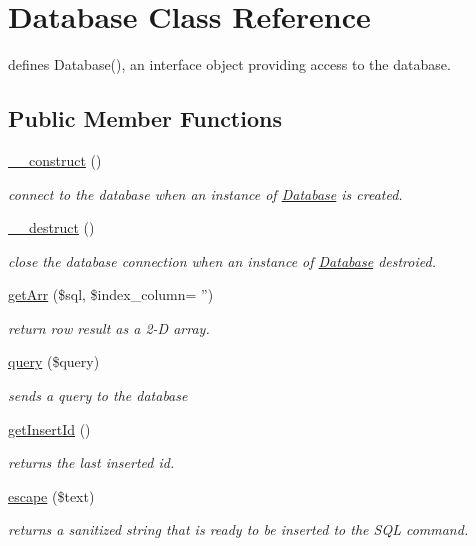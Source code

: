 \hypertarget{class_database}{
\section{Database Class Reference}
\label{class_database}
}


defines Database(), an interface object providing access to the database.  


\subsection*{Public Member Functions}
\begin{DoxyCompactItemize}
\item 
\hyperlink{class_database_a095c5d389db211932136b53f25f39685}{\_\-\_\-construct} ()
\begin{DoxyCompactList}\small\item\em connect to the database when an instance of \hyperlink{class_database}{Database} is created. \item\end{DoxyCompactList}\item 
\hyperlink{class_database_a421831a265621325e1fdd19aace0c758}{\_\-\_\-destruct} ()
\begin{DoxyCompactList}\small\item\em close the database connection when an instance of \hyperlink{class_database}{Database} destroied. \item\end{DoxyCompactList}\item 
\hyperlink{class_database_adcf17a809c87f756d7645da0483e9362}{getArr} (\$sql, \$index\_\-column= '')
\begin{DoxyCompactList}\small\item\em return row result as a 2-\/D array. \item\end{DoxyCompactList}\item 
\hyperlink{class_database_ac9fddec3f6bd1db128887a1b211d90f0}{query} (\$query)
\begin{DoxyCompactList}\small\item\em sends a query to the database \item\end{DoxyCompactList}\item 
\hyperlink{class_database_adda9fb830c1f42c98e409084d5e765b7}{getInsertId} ()
\begin{DoxyCompactList}\small\item\em returns the last inserted id. \item\end{DoxyCompactList}\item 
\hyperlink{class_database_a7b8701a38c6f1b80fd0659bfda3a68f7}{escape} (\$text)
\begin{DoxyCompactList}\small\item\em returns a sanitized string that is ready to be inserted to the SQL command. \item\end{DoxyCompactList}\end{DoxyCompactItemize}
